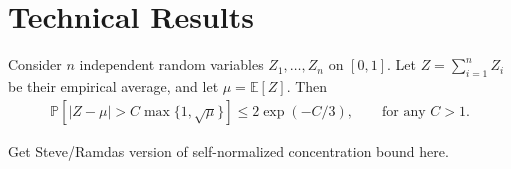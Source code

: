 \section{Technical Results}



\begin{theorem}\label{thm:chernoffbound} Consider $n$ independent random variables $Z_1,\ldots, Z_n$ on $[0,1]$. Let $Z = \sum_{i=1}^n Z_i$ be their empirical average, and let $\mu = \mathbb{E}\left[Z\right]$. Then
\begin{align*}
    \mathbb{P}\left[\lvert Z - \mu \rvert >  C \max\{1, \sqrt{\mu}\} \right] \le 2 \exp(-C/3), \qquad \text{for any } C>1.
\end{align*}
\end{theorem}

Get Steve/Ramdas version of self-normalized concentration bound here.


